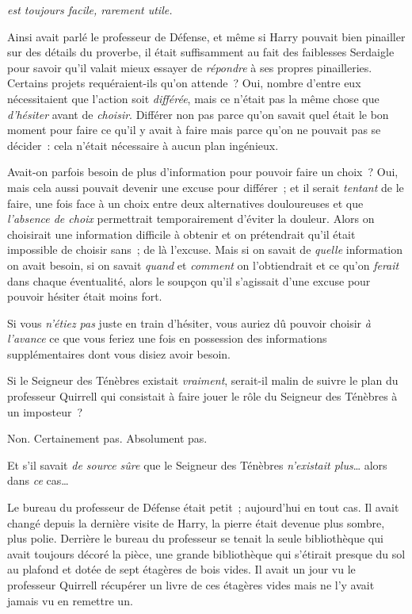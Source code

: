
 \emph{est toujours facile, rarement utile.}

\hplettrineextrapara
Ainsi avait parlé le professeur de Défense, et même si Harry pouvait bien pinailler sur des détails du proverbe, il était suffisamment au fait des faiblesses Serdaigle pour savoir qu'il valait mieux essayer de \emph{répondre} à ses propres pinailleries.
Certains projets requéraient-ils qu'on attende~?
Oui, nombre d'entre eux nécessitaient que l'action soit \emph{différée}, mais ce n'était pas la même chose que \emph{d'hésiter} avant de \emph{choisir}.
Différer non pas parce qu'on savait quel était le bon moment pour faire ce qu'il y avait à faire mais parce qu'on ne pouvait pas se décider~: cela n'était nécessaire à aucun plan ingénieux.

Avait-on parfois besoin de plus d'information pour pouvoir faire un choix~?
Oui, mais cela aussi pouvait devenir une excuse pour différer~; et il serait \emph{tentant} de le faire, une fois face à un choix entre deux alternatives douloureuses et que \emph{l'absence de choix} permettrait temporairement d'éviter la douleur.
Alors on choisirait une information difficile à obtenir et on prétendrait qu'il était impossible de choisir sans~; de là l'excuse.
Mais si on savait de \emph{quelle} information on avait besoin, si on savait \emph{quand} et \emph{comment} on l'obtiendrait et ce qu'on \emph{ferait} dans chaque éventualité, alors le soupçon qu'il s'agissait d'une excuse pour pouvoir hésiter était moins fort.

Si vous \emph{n'étiez pas} juste en train d'hésiter, vous auriez dû pouvoir choisir \emph{à l'avance} ce que vous feriez une fois en possession des informations supplémentaires dont vous disiez avoir besoin.

Si le Seigneur des Ténèbres existait \emph{vraiment}, serait-il malin de suivre le plan du professeur Quirrell qui consistait à faire jouer le rôle du Seigneur des Ténèbres à un imposteur~?

Non. Certainement pas.
Absolument pas.

Et s'il savait \emph{de source sûre} que le Seigneur des Ténèbres \emph{n'existait plus}… alors dans \emph{ce} cas…

Le bureau du professeur de Défense était petit~; aujourd'hui en tout cas.
Il avait changé depuis la dernière visite de Harry, la pierre était devenue plus sombre, plus polie.
Derrière le bureau du professeur se tenait la seule bibliothèque qui avait toujours décoré la pièce, une grande bibliothèque qui s'étirait presque du sol au plafond et dotée de sept étagères de bois vides.
Il avait un jour vu le professeur Quirrell récupérer un livre de ces étagères vides mais ne l’y avait jamais vu en remettre un.

